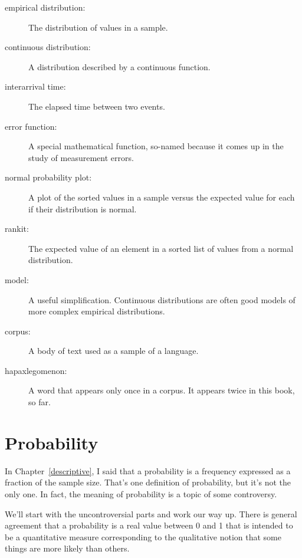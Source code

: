 \documentclass[12pt]{book}
\begin{document}
\begin{description}

\item[empirical distribution:] The distribution of values in a sample.

\item[continuous distribution:] A distribution described by a continuous
function.

\item[interarrival time:] The elapsed time between two events.

\item[error function:] A special mathematical function, so-named
  because it comes up in the study of measurement errors.

\item[normal probability plot:] A plot of the sorted values in a sample
versus the expected value for each if their distribution is normal.

\item[rankit:] The expected value of an element in a sorted list of
values from a normal distribution.

\item[model:] A useful simplification.  Continuous distributions are
often good models of more complex empirical distributions.

\item[corpus:] A body of text used as a sample of a language.

\item[hapaxlegomenon:] A word that appears only once in a corpus.
It appears twice in this book, so far.

\end{description}


\chapter{Probability}
\label{probability}

In Chapter~\ref{descriptive}, I said that a probability is a frequency
expressed as a fraction of the sample size.  That's one definition of
probability, but it's not the only one.  In fact, the meaning
of probability is a topic of some controversy.

We'll start with the uncontroversial parts and work our way up.  There
is general agreement that a probability is a real value between 0 and
1 that is intended to be a quantitative measure corresponding to the
qualitative notion that some things are more likely than others.
\end{document}
